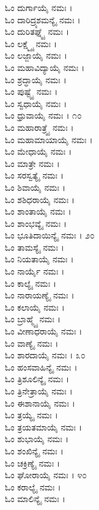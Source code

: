 \begin{multicols}{2} ಓಂ ದುರ್ಗಾಯೈ ನಮಃ ।\\
ಓಂ ದಾರಿದ್ರ್ಯಶಮನ್ಯೈ ನಮಃ ।\\
ಓಂ ದುರಿತಘ್ನ್ಯೈ ನಮಃ ।\\
ಓಂ ಲಕ್ಷ್ಮ್ಯೈ ನಮಃ ।\\
ಓಂ ಲಜ್ಜಾಯೈ ನಮಃ ।\\
ಓಂ ಮಹಾವಿದ್ಯಾಯೈ ನಮಃ ।\\
ಓಂ ಶ್ರದ್ಧಾಯೈ ನಮಃ ।\\
ಓಂ ಪುಷ್ಟ್ಯೈ ನಮಃ ।\\
ಓಂ ಸ್ವಧಾಯೈ ನಮಃ ।\\
ಓಂ ಧ್ರುವಾಯೈ ನಮಃ । ೧೦\\
ಓಂ ಮಹಾರಾತ್ರ್ಯೈ ನಮಃ ।\\
ಓಂ ಮಹಾಮಾಯಾಯೈ ನಮಃ ।\\
ಓಂ ಮೇಧಾಯೈ ನಮಃ ।\\
ಓಂ ಮಾತ್ರೇ ನಮಃ ।\\
ಓಂ ಸರಸ್ವತ್ಯೈ ನಮಃ ।\\
ಓಂ ಶಿವಾಯೈ ನಮಃ ।\\
ಓಂ ಶಶಿಧರಾಯೈ ನಮಃ ।\\
ಓಂ ಶಾಂತಾಯೈ ನಮಃ ।\\
ಓಂ ಶಾಂಭವ್ಯೈ ನಮಃ ।\\
ಓಂ ಭೂತಿದಾಯಿನ್ಯೈ ನಮಃ । ೨೦\\
ಓಂ ತಾಮಸ್ಯೈ ನಮಃ ।\\
ಓಂ ನಿಯತಾಯೈ ನಮಃ ।\\
ಓಂ ನಾರ್ಯೈ ನಮಃ ।\\
ಓಂ ಕಾಲ್ಯೈ ನಮಃ ।\\
ಓಂ ನಾರಾಯಣ್ಯೈ ನಮಃ ।\\
ಓಂ ಕಲಾಯೈ ನಮಃ ।\\
ಓಂ ಬ್ರಾಹ್ಮ್ಯೈ ನಮಃ ।\\
ಓಂ ವೀಣಾಧರಾಯೈ ನಮಃ ।\\
ಓಂ ವಾಣ್ಯೈ ನಮಃ ।\\
ಓಂ ಶಾರದಾಯೈ ನಮಃ । ೩೦\\
ಓಂ ಹಂಸವಾಹಿನ್ಯೈ ನಮಃ ।\\
ಓಂ ತ್ರಿಶೂಲಿನ್ಯೈ ನಮಃ ।\\
ಓಂ ತ್ರಿನೇತ್ರಾಯೈ ನಮಃ ।\\
ಓಂ ಈಶಾನಾಯೈ ನಮಃ ।\\
ಓಂ ತ್ರಯ್ಯೈ ನಮಃ ।\\
ಓಂ ತ್ರಯತಮಾಯೈ ನಮಃ ।\\
ಓಂ ಶುಭಾಯೈ ನಮಃ ।\\
ಓಂ ಶಂಖಿನ್ಯೈ ನಮಃ ।\\
ಓಂ ಚಕ್ರಿಣ್ಯೈ ನಮಃ ।\\
ಓಂ ಘೋರಾಯೈ ನಮಃ । ೪೦\\
ಓಂ ಕರಾಲ್ಯೈ ನಮಃ ।\\
ಓಂ ಮಾಲಿನ್ಯೈ ನಮಃ ।\\

\end{multicols}
